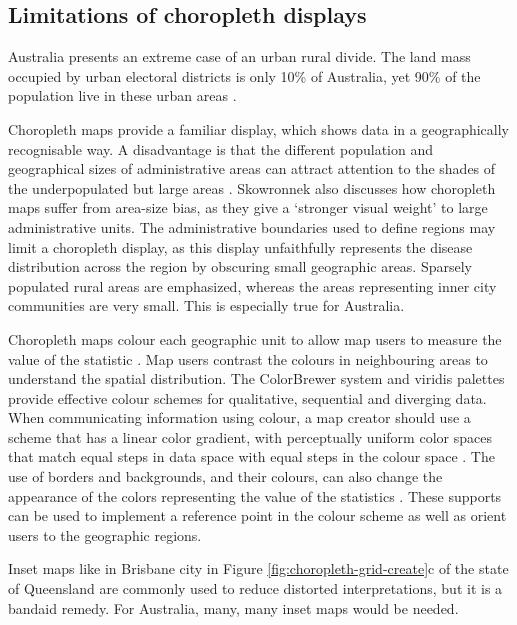 \documentclass{monashthesis}
\begin{document}
\hypertarget{ch:chorolimit}{%
\subsection{Limitations of choropleth displays}\label{ch:chorolimit}}

Australia presents an extreme case of an urban rural divide. The land mass occupied by urban electoral districts is only 10\% of Australia, yet 90\% of the population live in these urban areas \autocite{ACTUC}.

Choropleth maps provide a familiar display, which shows data in a geographically recognisable way. A disadvantage is that the different population and geographical sizes of administrative areas can attract attention to the shades of the underpopulated but large areas \autocite{EI}. Skowronnek also \autocite{BCM} discusses how choropleth maps suffer from area-size bias, as they give a `stronger visual weight' to large administrative units. The administrative boundaries used to define regions may limit a choropleth display, as this display unfaithfully represents the disease distribution across the region by obscuring small geographic areas. Sparsely populated rural areas are emphasized, whereas the areas representing inner city communities are very small. This is especially true for Australia.

Choropleth maps colour each geographic unit to allow map users to measure the value of the statistic \autocite{EI}. Map users contrast the colours in neighbouring areas to understand the spatial distribution. The ColorBrewer system \autocite{CB} and viridis \autocite{viridis} palettes provide effective colour schemes for qualitative, sequential and diverging data. When communicating information using colour, a map creator should use a scheme that has a linear color gradient, with perceptually uniform color spaces that match equal steps in data space with equal steps in the colour space \autocite{PUCS}.
The use of borders and backgrounds, and their colours, can also change the appearance of the colors representing the value of the statistics \autocite{CB}. These supports can be used to implement a reference point in the colour scheme as well as orient users to the geographic regions.

Inset maps like in Brisbane city in Figure \ref{fig:choropleth-grid-create}c of the state of Queensland are commonly used to reduce distorted interpretations, but it is a bandaid remedy. For Australia, many, many inset maps would be needed.
\end{document}

